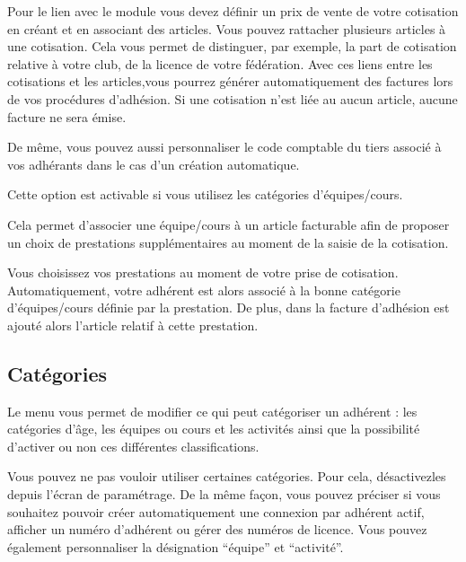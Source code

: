 \documentclass[a4paper,10pt,oneside,french]{sphinxmanual}
\begin{document}
Pour le lien avec le module  vous devez définir un prix de vente de votre cotisation en créant et en associant des articles.
Vous pouvez rattacher plusieurs articles à  une cotisation. Cela vous permet de distinguer, par exemple, la part de cotisation relative à votre club, de la licence de votre fédération.
Avec ces liens entre les cotisations et les articles,vous pourrez générer automatiquement des factures lors de vos procédures d’adhésion. Si une cotisation n’est liée au aucun article, aucune facture ne sera émise.

De même, vous pouvez aussi personnaliser le code comptable du tiers associé à vos adhérants dans le cas d’un création automatique.


Cette option est activable si vous utilisez les catégories d’équipes/cours.

Cela permet d’associer une équipe/cours à un article facturable afin de proposer un choix de prestations supplémentaires au moment de la saisie de la cotisation.

Vous choisissez vos prestations au moment de votre prise de cotisation.
Automatiquement, votre adhérent est alors associé à la bonne catégorie d’équipes/cours définie par la prestation.
De plus, dans la facture d’adhésion est ajouté alors l’article relatif à cette prestation.


\subsection{Catégories}
\label{\detokenize{member/config:categories}}
Le menu  vous permet de modifier ce qui peut catégoriser un adhérent : les catégories d’âge, les équipes ou cours et les activités ainsi que la possibilité d’activer ou non ces différentes classifications.

Vous pouvez ne pas vouloir utiliser certaines catégories. Pour cela, désactivez\sphinxhyphen{}les depuis l’écran de paramétrage.
De la même façon, vous pouvez préciser si vous souhaitez pouvoir créer automatiquement une connexion par adhérent actif, afficher un numéro d’adhérent ou gérer des numéros de licence.
Vous pouvez également personnaliser la désignation “équipe” et “activité”.
\begin{quote}

\noindent{}
\end{quote}
\end{document}
